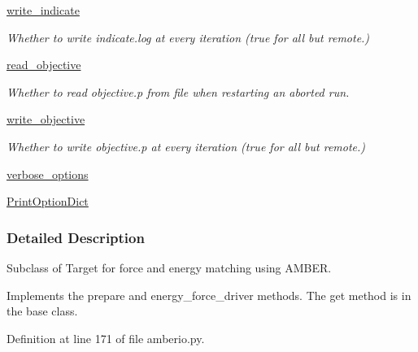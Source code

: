 \begin{DoxyCompactItemize}
\hyperlink{classforcebalance_1_1target_1_1Target_a3a2f5d4bbb8d6ecb580eadb261977a57}{write\-\_\-indicate}
\begin{DoxyCompactList}\small\item\em Whether to write indicate.\-log at every iteration (true for all but remote.) \end{DoxyCompactList}\item 
\hyperlink{classforcebalance_1_1target_1_1Target_a22bdc4bbce2020ae44b44ad3e444fda6}{read\-\_\-objective}
\begin{DoxyCompactList}\small\item\em Whether to read objective.\-p from file when restarting an aborted run. \end{DoxyCompactList}\item 
\hyperlink{classforcebalance_1_1target_1_1Target_a7a95624dfe03f0cee0e5f1ae09db306a}{write\-\_\-objective}
\begin{DoxyCompactList}\small\item\em Whether to write objective.\-p at every iteration (true for all but remote.) \end{DoxyCompactList}\item 
\hyperlink{classforcebalance_1_1BaseClass_afd68efa29ccd2f320f4cf82198214aac}{verbose\-\_\-options}
\item 
\hyperlink{classforcebalance_1_1BaseClass_afc6659278497d7245bc492ecf405ccae}{Print\-Option\-Dict}
\end{DoxyCompactItemize}


\subsubsection{Detailed Description}
Subclass of Target for force and energy matching using A\-M\-B\-E\-R. 

Implements the prepare and energy\-\_\-force\-\_\-driver methods. The get method is in the base class. 

Definition at line 171 of file amberio.\-py.



